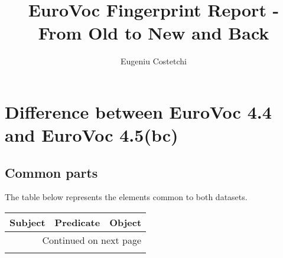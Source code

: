 \documentclass[10pt,a4paper,titlepage,final]{article}
\author{Eugeniu Costetchi}
\title{EuroVoc Fingerprint Report - From Old to New and Back}
\begin{document}
\maketitle
\tableofcontents
\newpage
\section{Difference between EuroVoc 4.4 and EuroVoc 4.5(bc)}
\subsection{Common parts}
The table below represents the elements common to both datasets.
\begin{tabularx}{\textwidth}{llX}
\toprule
                    Subject &               Predicate &                                             Object \\
\midrule
\endhead
\midrule
\multicolumn{3}{r}{{Continued on next page}} \\
\midrule
\endfoot


\end{tabularx}
\end{document}
